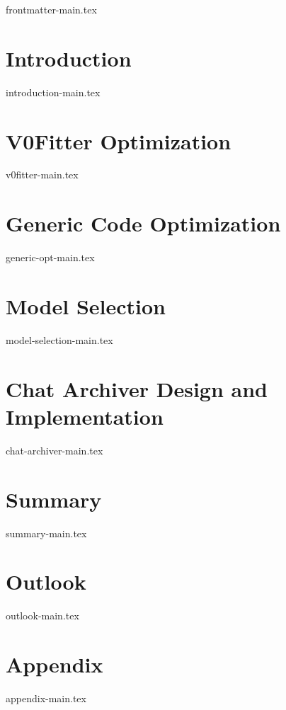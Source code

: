 {frontmatter-main.tex}

\newpage
{}
\setlength{\parskip}{5pt}
\section{Introduction}
{introduction-main.tex}

\newpage
\section{V0Fitter Optimization}
{v0fitter-main.tex}

\newpage
\section{Generic Code Optimization}
{generic-opt-main.tex}

\newpage
\section{Model Selection}\label{sec:model-selection}
{model-selection-main.tex}

\newpage
\section{Chat Archiver Design and Implementation}\label{sec:chat-archiver}
{chat-archiver-main.tex}

\newpage
\section{Summary}
{summary-main.tex}

\section{Outlook}
{outlook-main.tex}

\newpage
\printbibliography

\newpage
\section{Appendix}
{appendix-main.tex}

\newpage\null\thispagestyle{empty}

